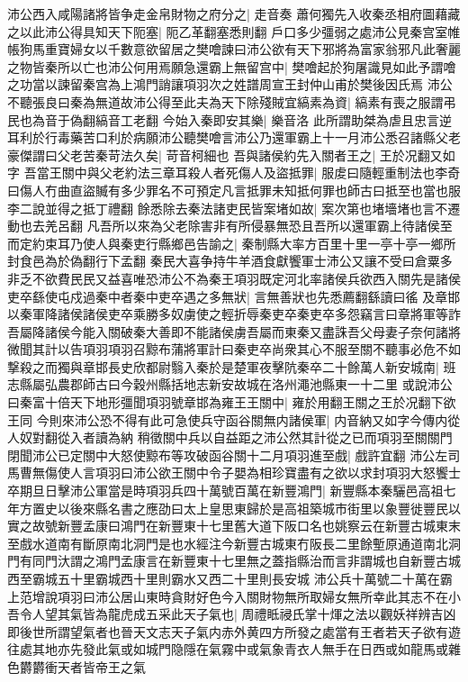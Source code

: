 沛公西入咸陽諸將皆争走金帛財物之府分之|{
	走音奏}
蕭何獨先入收秦丞相府圖藉藏之以此沛公得具知天下阨塞|{
	阨乙革翻塞悉則翻}
戶口多少彊弱之處沛公見秦宫室帷帳狗馬重寶婦女以千數意欲留居之樊噲諫曰沛公欲有天下邪將為富家翁邪凡此奢麗之物皆秦所以亡也沛公何用焉願急還霸上無留宫中|{
	樊噲起於狗屠識見如此予謂噲之功當以諫留秦宫為上鴻門誚讓項羽次之姓譜周宣王封仲山甫於樊後因氏焉}
沛公不聽張良曰秦為無道故沛公得至此夫為天下除殘賊宜縞素為資|{
	縞素有喪之服謂弔民也為音于偽翻縞音工老翻}
今始入秦即安其樂|{
	樂音洛}
此所謂助桀為虐且忠言逆耳利於行毒藥苦口利於病願沛公聽樊噲言沛公乃還軍霸上十一月沛公悉召諸縣父老豪傑謂曰父老苦秦苛法久矣|{
	苛音柯細也}
吾與諸侯約先入關者王之|{
	王於况翻又如字}
吾當王關中與父老約法三章耳殺人者死傷人及盜抵罪|{
	服䖍曰隨輕重制法也李奇曰傷人冇曲直盜贓有多少罪名不可預定凡言抵罪未知抵何罪也師古曰抵至也當也服李二說並得之抵丁禮翻}
餘悉除去秦法諸吏民皆案堵如故|{
	案次第也堵墻堵也言不遷動也去羌呂翻}
凡吾所以來為父老除害非有所侵暴無恐且吾所以還軍霸上待諸侯至而定約束耳乃使人與秦吏行縣鄉邑告諭之|{
	秦制縣大率方百里十里一亭十亭一鄉所封食邑為於偽翻行下孟翻}
秦民大喜争持牛羊酒食獻饗軍士沛公又讓不受曰倉粟多非乏不欲費民民又益喜唯恐沛公不為秦王項羽既定河北率諸侯兵欲西入關先是諸侯吏卒繇使屯戍過秦中者秦中吏卒遇之多無狀|{
	言無善狀也先悉薦翻繇讀曰徭}
及章邯以秦軍降諸侯諸侯吏卒乘勝多奴虜使之輕折辱秦吏卒秦吏卒多怨竊言曰章將軍等詐吾屬降諸侯今能入關破秦大善即不能諸侯虜吾屬而東秦又盡誅吾父母妻子奈何諸將微聞其計以告項羽項羽召黥布蒲將軍計曰秦吏卒尚衆其心不服至關不聽事必危不如撃殺之而獨與章邯長史欣都尉翳入秦於是楚軍夜擊阬秦卒二十餘萬人新安城南|{
	班志縣屬弘農郡師古曰今穀州縣括地志新安故城在洛州澠池縣東一十二里}
或說沛公曰秦富十倍天下地形彊聞項羽號章邯為雍王王關中|{
	雍於用翻王關之王於况翻下欲王同}
今則來沛公恐不得有此可急使兵守函谷關無内諸侯軍|{
	内音納又如字今傳内從人奴對翻從入者讀為納}
稍徵關中兵以自益距之沛公然其計從之已而項羽至關關門閉聞沛公已定關中大怒使黥布等攻破函谷關十二月項羽進至戲|{
	戲許宜翻}
沛公左司馬曹無傷使人言項羽曰沛公欲王關中令子嬰為相珍寶盡有之欲以求封項羽大怒饗士卒期旦日擊沛公軍當是時項羽兵四十萬號百萬在新豐鴻門|{
	新豐縣本秦驪邑高祖七年方置史以後來縣名書之應劭曰太上皇思東歸於是高祖築城市街里以象豐徙豐民以實之故號新豐孟康曰鴻門在新豐東十七里舊大道下阪口名也姚察云在新豐古城東末至戲水道南有斷原南北洞門是也水經注今新豐古城東冇阪長二里餘塹原通道南北洞門有同門汏謂之鴻門孟康言在新豐東十七里無之蓋指縣治而言非謂城也自新豐古城西至霸城五十里霸城西十里則霸水又西二十里則長安城}
沛公兵十萬號二十萬在霸上范增說項羽曰沛公居山東時貪財好色今入關財物無所取婦女無所幸此其志不在小吾令人望其氣皆為龍虎成五采此天子氣也|{
	周禮眡祲氏掌十煇之法以觀妖祥辨吉凶即後世所謂望氣者也晉天文志天子氣内赤外黄四方所發之處當有王者若天子欲有遊往處其地亦先發此氣或如城門隐隱在氣霧中或氣象青衣人無手在日西或如龍馬或雜色欝欝衝天者皆帝王之氣}

